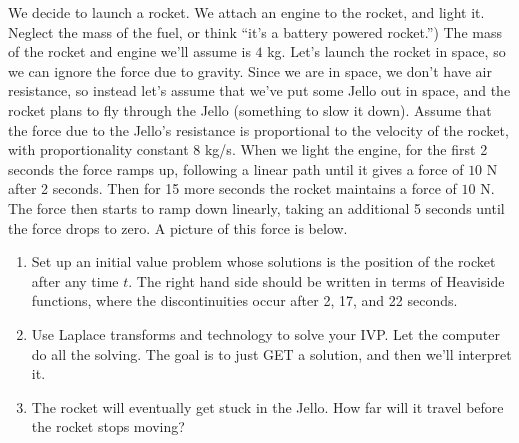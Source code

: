 \begin{problem}
 We decide to launch a rocket.  We attach an engine to the rocket, and light it. Neglect the mass of the fuel, or think ``it's a battery powered rocket.'')   The mass of the rocket and engine we'll assume is $4$ kg. Let's launch the rocket in space, so we can ignore the force due to gravity.  Since we are in space, we don't have air resistance, so instead let's assume that we've put some Jello out in space, and the rocket plans to fly through the Jello (something to slow it down). Assume that the force due to the Jello's resistance is proportional to the velocity of the rocket, with proportionality constant $8$ kg/s.  When we light the engine, for the first 2 seconds the force ramps up, following a linear path until it gives a force of $10$ N after 2 seconds.  Then for 15 more seconds the rocket maintains a force of $10$ N.  The force then starts to ramp down linearly, taking an additional 5 seconds until the force drops to zero. A picture of this force is below.
\begin{center}
\end{center}

\begin{enumerate}
 \item Set up an initial value problem whose solutions is the position of the rocket after any time $t$. The right hand side should be written in terms of Heaviside functions, where the discontinuities occur after 2, 17, and 22 seconds.
 \item Use Laplace transforms and technology to solve your IVP. Let the computer do all the solving.  The goal is to just GET a solution, and then we'll interpret it.
 \item The rocket will eventually get stuck in the Jello.  How far will it travel before the rocket stops moving?
\end{enumerate}

\end{problem}






